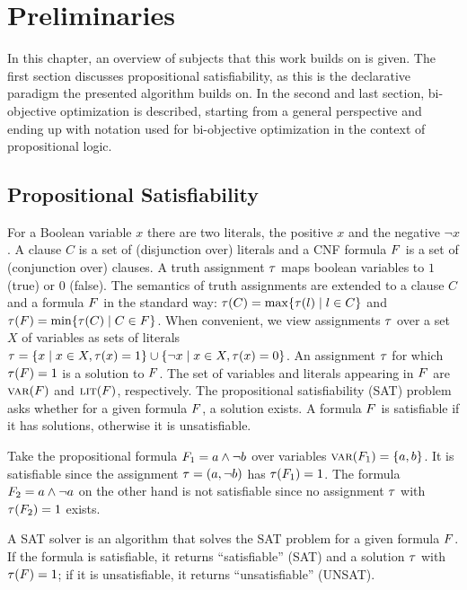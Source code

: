 \chapter{Preliminaries\label{chap:preliminaries}}

In this chapter, an overview of subjects that this work builds on is given.
The first section discusses propositional satisfiability, as this is the declarative paradigm the presented algorithm builds on.
In the second and last section, bi-objective optimization is described, starting from a general perspective and ending up with notation used for bi-objective optimization in the context of propositional logic.

\section{Propositional Satisfiability\label{sec:sat}}

For a Boolean variable $x$ there are two literals, the positive $x$ and the negative $\lnot x$. 
A clause $C$ is a set of (disjunction over) literals and a CNF formula $F$ is a set of (conjunction over) clauses.
A truth assignment $\tau$ maps boolean variables to $1$ (true) or $0$ (false).
The semantics of truth assignments are extended to a clause $C$ and a formula $F$ in the standard way: $\tau(C) = \max\{ \tau(l) \mid l \in C\}$ and $\tau(F) = \min\{\tau(C) \mid C \in F\}$.
When convenient, we view assignments $\tau$ over a set $X$ of variables as sets of literals $\tau = \{ x \mid x \in X,  \tau(x) = 1\} \cup \{ \lnot x \mid x \in X, \tau(x) = 0\}$.
An assignment $\tau$ for which $\tau(F) = 1$ is a solution to $F$.
The set of variables and literals appearing in $F$ are $\textsc{var}(F)$ and $\textsc{lit}(F)$, respectively.  
The propositional satisfiability (SAT) problem asks whether for a given formula $F$, a solution exists.
A formula $F$ is satisfiable if it has solutions, otherwise it is unsatisfiable.

\begin{example}
  Take the propositional formula $F_1 = a \land \lnot b$ over variables $\textsc{var}(F_1) = \{a,b\}$.
  It is satisfiable since the assignment $\tau=(a,\lnot b)$ has $\tau(F_1)=1$.
  The formula $F_2 = a \land \lnot a$ on the other hand is not satisfiable since no assignment $\tau$ with $\tau(F_2)=1$ exists.
\end{example}

A SAT solver is an algorithm that solves the SAT problem for a given formula $F$.
If the formula is satisfiable, it returns ``satisfiable'' (SAT) and a solution $\tau$ with $\tau(F)=1$;
if it is unsatisfiable, it returns ``unsatisfiable'' (UNSAT).

